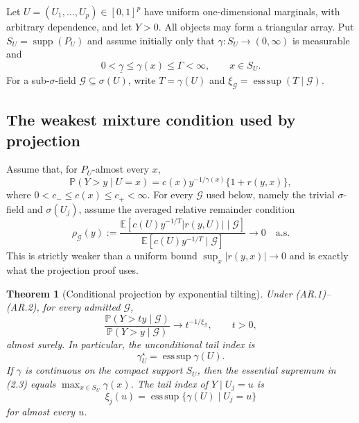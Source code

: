 \documentclass[11pt]{article}
\newtheorem{theorem}{Theorem}[section]
\theoremstyle{definition}\newtheorem{definition}[theorem]{Definition}
\theoremstyle{remark}\newtheorem{remark}[theorem]{Remark}
\DeclareMathOperator*{\esssup}{ess\,sup}
\DeclareMathOperator{\supp}{supp}
\newcommand{\Pp}{\mathbb P}
\newcommand{\E}{\mathbb E}
\newcommand{\gU}{\gamma_U^\star}
\newcommand{\1}{\mathbf 1}
\begin{document}
Let $U=(U_1,\ldots,U_p)\in[0,1]^p$ have uniform one-dimensional
marginals, with arbitrary dependence, and let $Y>0$. All objects may form a
triangular array. Put $S_U=\supp(P_U)$ and assume initially only that
$\gamma:S_U\to(0,\infty)$ is measurable and
\begin{equation}
0<\underline\gamma\le \gamma(x)\le\Gamma<\infty,
\qquad x\in S_U. \tag{2.1}
\end{equation}
For a sub-$\sigma$-field $\mathcal G\subseteq\sigma(U)$, write
$T=\gamma(U)$ and $\xi_{\mathcal G}=\esssup(T\mid\mathcal G)$.

\subsection{The weakest mixture condition used by projection}

Assume that, for $P_U$-almost every $x$,
\begin{equation}
\Pp(Y>y\mid U=x)=c(x)y^{-1/\gamma(x)}\{1+r(y,x)\}, \tag{AR.1}
\end{equation}
where $0<c_-\le c(x)\le c_+<\infty$. For every
$\mathcal G$ used below, namely the trivial $\sigma$-field and
$\sigma(U_j)$, assume the averaged relative remainder condition
\begin{equation}
\rho_{\mathcal G}(y):=
\frac{\E[c(U)y^{-1/T}|r(y,U)|\mid\mathcal G]}
{\E[c(U)y^{-1/T}\mid\mathcal G]}
\longrightarrow0\quad\text{a.s.} \tag{AR.2}
\end{equation}
This is strictly weaker than a uniform bound
$\sup_x|r(y,x)|\to0$ and is exactly what the projection proof uses.

\begin{theorem}[Conditional projection by exponential tilting]
\label{thm:projection}
Under \emph{(AR.1)--(AR.2)}, for every admitted $\mathcal G$,
\begin{equation}
\frac{\Pp(Y>ty\mid\mathcal G)}{\Pp(Y>y\mid\mathcal G)}
\longrightarrow t^{-1/\xi_{\mathcal G}},
\qquad t>0, \tag{2.2}
\end{equation}
almost surely. In particular, the unconditional tail index is
\begin{equation}
\gU=\esssup\gamma(U). \tag{2.3}
\end{equation}
If $\gamma$ is continuous on the compact support $S_U$, then the essential
supremum in (2.3) equals $\max_{x\in S_U}\gamma(x)$. The tail index of
$Y\mid U_j=u$ is
\begin{equation}
\xi_j(u)=\esssup\{\gamma(U)\mid U_j=u\} \tag{2.4}
\end{equation}
for almost every $u$.
\end{theorem}

\end{document}
